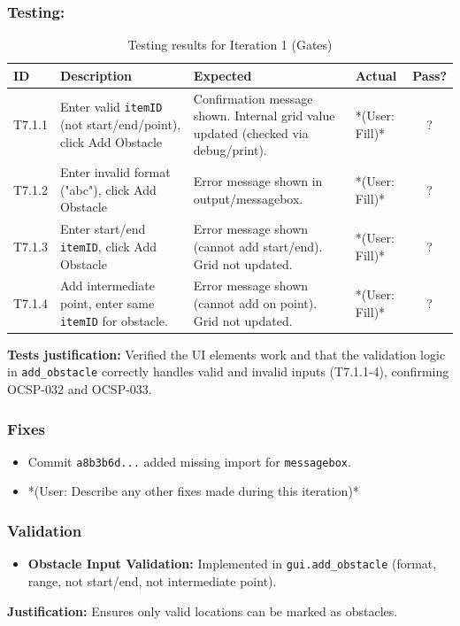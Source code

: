 \subsubsection{Testing:}
\begin{table}[htbp]
	\centering
	\begin{tabularx}{\textwidth}{|l|X|p{4.5cm}|p{1.5cm}|c|}
		\hline
		\textbf{ID} & \textbf{Description} & \textbf{Expected} & \textbf{Actual} & \textbf{Pass?} \\
		\hline
		T7.1.1 & Enter valid \verb|itemID| (not start/end/point), click Add Obstacle & Confirmation message shown. Internal grid value updated (checked via debug/print). & *(User: Fill)* & ? \\
		\hline
		T7.1.2 & Enter invalid format ("abc"), click Add Obstacle & Error message shown in output/messagebox. & *(User: Fill)* & ? \\
		\hline
		T7.1.3 & Enter start/end \verb|itemID|, click Add Obstacle & Error message shown (cannot add start/end). Grid not updated. & *(User: Fill)* & ? \\
		\hline
		T7.1.4 & Add intermediate point, enter same \verb|itemID| for obstacle. & Error message shown (cannot add on point). Grid not updated. & *(User: Fill)* & ? \\
		\hline
	\end{tabularx}
	\caption{Testing results for Iteration 1 (Gates)}
\end{table}
\textbf{Tests justification:} Verified the UI elements work and that the validation logic in \verb|add_obstacle| correctly handles valid and invalid inputs (T7.1.1-4), confirming OCSP-032 and OCSP-033.

\subsubsection{Fixes}
\begin{itemize}
	\item Commit \verb|a8b3b6d...| added missing import for \verb|messagebox|.
	\item *(User: Describe any other fixes made during this iteration)*
\end{itemize}

\subsubsection{Validation}
\begin{itemize}
	\item \textbf{Obstacle Input Validation:} Implemented in \verb|gui.add_obstacle| (format, range, not start/end, not intermediate point).
\end{itemize}
\textbf{Justification:} Ensures only valid locations can be marked as obstacles.

